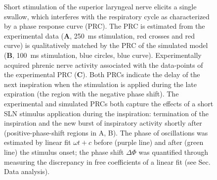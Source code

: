 \documentclass[pdflatex,sn-mathphys-ay]{sn-jnl}%
\theoremstyle{thmstyleone}%
\theoremstyle{thmstyletwo}%
\theoremstyle{thmstylethree}%
\begin{document}
\begin{figure}
 \begin{center}
 \end{center}
 \caption{
 Short stimulation of the superior laryngeal nerve elicits a single swallow, which interferes with the respiratory cycle as characterized by a phase response curve (PRC). The PRC is estimated from the experimental data (\textbf{A}, 250~ms stimulation, red crosses and red curve) is qualitatively matched by the PRC of the simulated model (\textbf{B}, 100~ms stimulation, blue circles, blue curve). Experimentally acquired phrenic nerve activity associated with the data-points of the experimental PRC (\textbf{C}).
 Both PRCs indicate the delay of the next inspiration when the stimulation is applied during the late expiration (the region with the negative phase shift). The experimental and simulated PRCs both capture the effects of a short SLN stimulus application during the inspiration: termination of the inspiration and the new burst of inspiratory activity shortly after (positive-phase-shift regions in A, B).
 The phase of oscillations was estimated by linear fit $\omega t + c$ before (purple line) and after (green line) the stimulus onset; the phase shift $\Delta \Phi$ was quantified through measuring the discrepancy in free coefficients of a linear fit (see Sec. Data analysis).
}\label{fig: PRC_comparison}
\end{figure}
\end{document}
